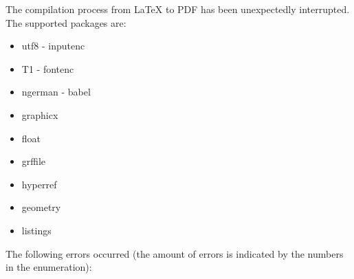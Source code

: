 The compilation process from \LaTeX{} to PDF has been unexpectedly interrupted.
The supported packages are:

\begin{itemize}
    \item utf8 - inputenc
    \item T1 - fontenc
    \item ngerman - babel
    \item graphicx
    \item float
    \item grffile
    \item hyperref
    \item geometry
    \item listings
\end{itemize}

The following errors occurred (the amount of errors is indicated by the numbers in the enumeration):

